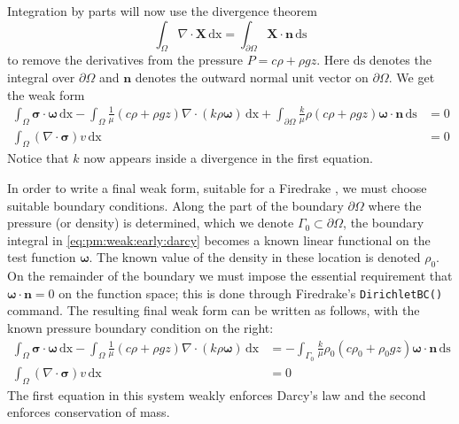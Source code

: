 \documentclass[11pt]{amsart}
\newcommand{\bn}{\mathbf{n}}
\newcommand{\bX}{\mathbf{X}}
\newcommand{\bsigma}{\bm{\sigma}}
\newcommand{\bomega}{\bm{\omega}}
\newcommand{\dx}{\mathrm{dx}}
\newcommand{\ds}{\mathrm{ds}}
\newcommand{\Div}{\nabla\cdot}
\begin{document}
Integration by parts will now use the divergence theorem
    $$\int_\Omega \Div \bX\,\dx = \int_{\partial\Omega} \bX\cdot \bn\,\ds$$
to remove the derivatives from the pressure $P=c\rho+\rho g z$.  Here $\ds$ denotes the integral over $\partial\Omega$ and $\bn$ denotes the outward normal unit vector on $\partial\Omega$.  We get the weak form
\begin{subequations}
\label{eq:pm:weak:early}
\begin{align}
\int_\Omega \bsigma\cdot \bomega\,\dx - \int_\Omega \frac{1}{\mu} \left(c \rho + \rho g z\right) \Div(k\rho\bomega)\,\dx + \int_{\partial\Omega} \frac{k}{\mu} \rho \left(c \rho + \rho g z\right) \bomega\cdot\bn\,\ds &= 0 \label{eq:pm:weak:early:darcy}\\
\int_\Omega (\Div \bsigma) v\,\dx &= 0
\end{align}
\end{subequations}
Notice that $k$ now appears inside a divergence in the first equation.


In order to write a final weak form, suitable for a Firedrake \citep{Ham2023}, we must choose suitable boundary conditions.  Along the part of the boundary $\partial\Omega$ where the pressure (or density) is determined, which we denote $\Gamma_0 \subset \partial\Omega$, the boundary integral in \eqref{eq:pm:weak:early:darcy} becomes a known linear functional on the test function $\bomega$.  The known value of the density in these location is denoted $\rho_0$.  On the remainder of the boundary we must impose the essential requirement that $\bomega\cdot \bn=0$ on the function space; this is done through Firedrake's \verb|DirichletBC()| command.  The resulting final weak form can be written as follows, with the known pressure boundary condition on the right:
\begin{subequations}
\label{eq:pm:weak}
\begin{align}
\int_\Omega \bsigma\cdot \bomega\,\dx - \int_\Omega \frac{1}{\mu} \left(c \rho + \rho g z\right) \Div(k\rho\bomega)\,\dx &= -\int_{\Gamma_0} \frac{k}{\mu} \rho_0 \left(c \rho_0 + \rho_0 g z\right) \bomega\cdot\bn\,\ds \label{eq:pm:weak:darcy}\\
\int_\Omega (\Div \bsigma) v\,\dx &= 0
\end{align}
\end{subequations}
The first equation in this system weakly enforces Darcy's law and the second enforces conservation of mass.
\end{document}
